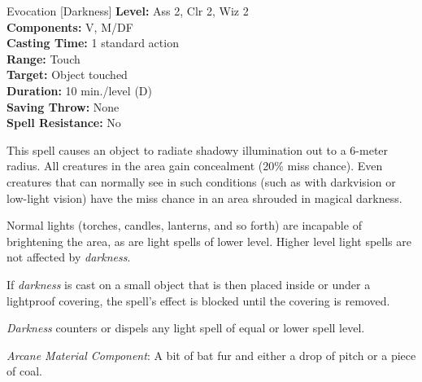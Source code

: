 {Evocation [Darkness]}
{
	\textbf{Level:}
	Ass 2, Clr 2, Wiz 2\\
	\textbf{Components:}
	V, M/DF\\
	\textbf{Casting Time:}
	1 standard action\\
	\textbf{Range:}
	Touch\\
	\textbf{Target:}
	Object touched\\
	\textbf{Duration:}
	10 min./level (D)\\
	\textbf{Saving Throw:}
	None\\
	\textbf{Spell Resistance:}
	No\\
}
{
	This spell causes an object to radiate shadowy illumination out to a 6-meter radius. All creatures in the area gain concealment (20\% miss chance). Even creatures that can normally see in such conditions (such as with darkvision or low-light vision) have the miss chance in an area shrouded in magical darkness.

	Normal lights (torches, candles, lanterns, and so forth) are incapable of brightening the area, as are light spells of lower level. Higher level light spells are not affected by \emph{darkness}.

	If \emph{darkness} is cast on a small object that is then placed inside or under a lightproof covering, the spell's effect is blocked until the covering is removed.

	\emph{Darkness} counters or dispels any light spell of equal or lower spell level.

	\textit{Arcane Material Component}:
	A bit of bat fur and either a drop of pitch or a piece of coal.

}
